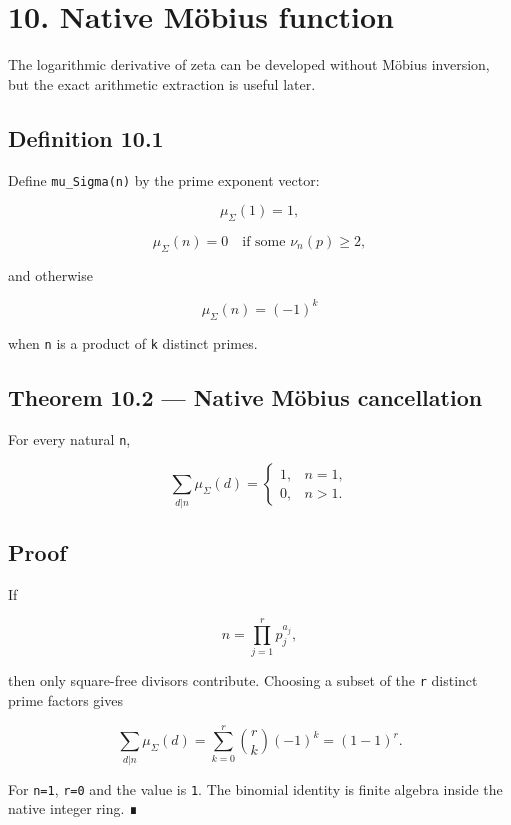 \hypertarget{native-muxf6bius-function}{%
\section{10. Native Möbius function}\label{native-muxf6bius-function}}

The logarithmic derivative of zeta can be developed without Möbius inversion,
but the exact arithmetic extraction is useful later.

\hypertarget{definition-10.1}{%
\subsection{Definition 10.1}\label{definition-10.1}}

Define \texttt{mu\_Sigma(n)} by the prime exponent vector:

\[
\mu_\Sigma(1)=1,
\]

\[
\mu_\Sigma(n)=0
\quad\text{if some }\nu_n(p)\ge2,
\]

and otherwise

\[
\mu_\Sigma(n)=(-1)^k
\]

when \texttt{n} is a product of \texttt{k} distinct primes.

\hypertarget{theorem-10.2-native-muxf6bius-cancellation}{%
\subsection{Theorem 10.2 --- Native Möbius cancellation}\label{theorem-10.2-native-muxf6bius-cancellation}}

For every natural \texttt{n},

\[
\boxed{
\sum_{d|n}\mu_\Sigma(d)
=
\begin{cases}
1,&n=1,\\
0,&n>1.
\end{cases}
}
\]

\hypertarget{proof-12}{%
\subsection{Proof}\label{proof-12}}

If

\[
n=\prod_{j=1}^{r}p_j^{a_j},
\]

then only square-free divisors contribute. Choosing a subset of the \texttt{r} distinct
prime factors gives

\[
\sum_{d|n}\mu_\Sigma(d)
=
\sum_{k=0}^{r}\binom{r}{k}(-1)^k
=(1-1)^r.
\]

For \texttt{n=1}, \texttt{r=0} and the value is \texttt{1}. The binomial identity is finite algebra
inside the native integer ring. ∎

